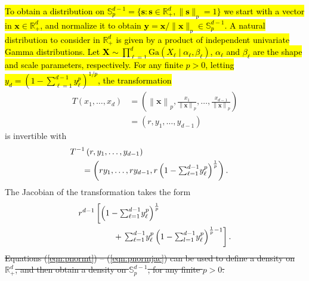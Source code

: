 \documentclass[iicol,sn-basic]{sn-jnl}
\newcommand{\norm}[1]{\left\lVert #1 \right\rVert}
\newcommand{\pnorm}[2]{\norm{#1}_{#2}}
\theoremstyle{thmstyleone}
\begin{document}
\hl{To obtain a distribution on ${\mathbb S}_{p}^{d-1}=\{\bm{s} : \bm{s} \in {\mathbb R}_{+}^{d}, \| \bm{s}\|_{p} = 1\}$ we start with a vector in $\bm{x} \in {\mathbb R}^d_+$, and normalize it to obtain $\bm{y} = \bm{x}/\|\bm{x}\|_p \in {\mathbb S}_p^{d-1}$. A natural  distribution to consider in ${\mathbb R}^d_+$ is given by a product of independent univariate Gamma distributions. Let $\bm{ X} \sim \prod_{\ell = 1}^d\text{Ga}\left(X_{\ell}\mid\alpha_{\ell},\beta_{\ell}\right)$, $\alpha_\ell$ and $\beta_\ell$ are the shape and scale parameters, respectively. For any finite $p>0$, letting $ y_d = (1 - {\textstyle\sum}_{\ell = 1}^{d-1}y_{\ell}^p)^{1/p}$, the transformation}
\begin{equation}
\label{eqn:pnormt}
\begin{aligned}
T(x_1,\ldots,x_d) &= \left(\pnorm{\bm{x}}{p}, \frac{x_1}{\pnorm{\bm{x}}{p}}, \ldots , \frac{x_{d-1}}{\pnorm{\bm{x}}{p}}\right) \\
&= (r,y_1,\ldots,y_{d-1})
\end{aligned}
\end{equation}
is invertible with
\begin{equation}
\label{eqn:pnormtinv}
\begin{aligned}
&\hspace{-0.5cm}T^{-1}\left(r,y_1,\ldots,y_{d-1}\right)\\
& = \left(ry_1,\ldots,ry_{d-1}, r\left(1 - {\textstyle\sum}_{\ell = 1}^{d-1}y_{\ell}^p\right)^{\frac{1}{p}}\right).
\end{aligned}
\end{equation}
The Jacobian of the transformation takes the form
\begin{equation}
\label{eqn:pnormjac}
\begin{aligned}
r^{d-1}\left[\left(1 - {\textstyle\sum}_{\ell = 1}^{d-1}y_{\ell}^p\right)^{\frac{1}{p}} \right. & \\
&\hspace{-2cm}+ \left. {\textstyle\sum}_{\ell = 1}^{d-1}y_{\ell}^p\left(1 - {\textstyle\sum}_{l=1}^{d-1} y_{\ell}^p\right)^{\frac{1}{p} - 1}\right].
\end{aligned}
\end{equation}
\st{Equations (\mbox{\ref{eqn:pnormt}}) -- (\mbox{\ref{eqn:pnormjac}}) can be used to define a density on ${\mathbb R}^d_+$, and then obtain a density on ${\mathbb S}_{p}^{d-1}$, for any finite $p>0$.}
\end{document}
